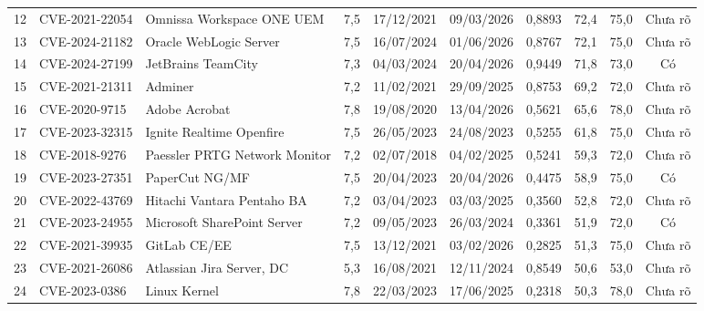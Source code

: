 \documentclass[runningheads]{llncs}
\begin{document}
\begin{table}
\begin{tabular}{r l >{\raggedright\arraybackslash}p{2.0cm} c c c c c c c}
12 & CVE-2021-22054 & Omnissa Workspace ONE UEM & 7,5 & 17/12/2021 & 09/03/2026 & 0,8893 & 72,4 & 75,0 & Chưa rõ \\
13 & CVE-2024-21182 & Oracle WebLogic Server & 7,5 & 16/07/2024 & 01/06/2026 & 0,8767 & 72,1 & 75,0 & Chưa rõ \\
14 & CVE-2024-27199 & JetBrains TeamCity & 7,3 & 04/03/2024 & 20/04/2026 & 0,9449 & 71,8 & 73,0 & Có \\
15 & CVE-2021-21311 & Adminer & 7,2 & 11/02/2021 & 29/09/2025 & 0,8753 & 69,2 & 72,0 & Chưa rõ \\
16 & CVE-2020-9715 & Adobe Acrobat & 7,8 & 19/08/2020 & 13/04/2026 & 0,5621 & 65,6 & 78,0 & Chưa rõ \\
17 & CVE-2023-32315 & Ignite Realtime Openfire & 7,5 & 26/05/2023 & 24/08/2023 & 0,5255 & 61,8 & 75,0 & Chưa rõ \\
18 & CVE-2018-9276 & Paessler PRTG Network Monitor & 7,2 & 02/07/2018 & 04/02/2025 & 0,5241 & 59,3 & 72,0 & Chưa rõ \\
19 & CVE-2023-27351 & PaperCut NG/MF & 7,5 & 20/04/2023 & 20/04/2026 & 0,4475 & 58,9 & 75,0 & Có \\
20 & CVE-2022-43769 & Hitachi Vantara Pentaho BA & 7,2 & 03/04/2023 & 03/03/2025 & 0,3560 & 52,8 & 72,0 & Chưa rõ \\
21 & CVE-2023-24955 & Microsoft SharePoint Server & 7,2 & 09/05/2023 & 26/03/2024 & 0,3361 & 51,9 & 72,0 & Có \\
22 & CVE-2021-39935 & GitLab CE/EE & 7,5 & 13/12/2021 & 03/02/2026 & 0,2825 & 51,3 & 75,0 & Chưa rõ \\
23 & CVE-2021-26086 & Atlassian Jira Server, DC & 5,3 & 16/08/2021 & 12/11/2024 & 0,8549 & 50,6 & 53,0 & Chưa rõ \\
24 & CVE-2023-0386 & Linux Kernel & 7,8 & 22/03/2023 & 17/06/2025 & 0,2318 & 50,3 & 78,0 & Chưa rõ \\
\bottomrule
\end{tabular}
\end{table}
\end{document}
